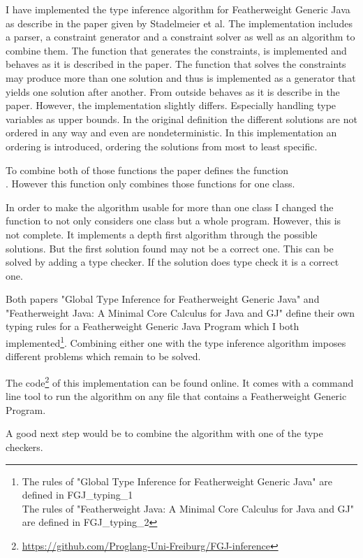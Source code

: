 I have implemented the type inference algorithm for Featherweight Generic Java as describe in the paper\cite{FGJ} given by Stadelmeier et al.
The implementation includes a parser, a constraint generator and a constraint solver as well as an algorithm to combine them.
The function  that generates the constraints, is implemented and behaves as it is described in the paper.
The function  that solves the constraints may produce more than one solution and thus is implemented as a generator that
yields one solution after another. From outside  behaves as it is describe in the paper. However, the implementation slightly
differs. Especially handling type variables as upper bounds. In the original definition the different solutions are not ordered in any way
and even are nondeterministic. In this implementation an ordering is introduced, ordering the solutions from most to least specific.

To combine both of those functions the paper defines the function\\. However this function only combines those functions
for one class.

In order to make the algorithm usable for more than one class I changed the function  to not only considers one class but a whole
program. However, this is not complete. It implements a depth first algorithm through the possible solutions. But the first solution found
may not be a correct one. This can be solved by adding a type checker. If the solution does type check it is a correct one.

Both papers "Global Type Inference for Featherweight Generic Java"\cite{FGJ} and "Featherweight Java: A Minimal Core
Calculus for Java and GJ"\cite{FJ} define their own typing rules for a Featherweight Generic Java Program which I both implemented\footnote{The rules of "Global Type Inference for Featherweight Generic Java" are defined in FGJ\_typing\_1\\The rules of "Featherweight Java: A Minimal Core Calculus for Java and GJ" are defined in FGJ\_typing\_2}.
Combining either one with the type inference algorithm imposes different problems which remain to be solved.

The code\footnote{\url{https://github.com/Proglang-Uni-Freiburg/FGJ-inference}} of this implementation can be found online. It comes with a command line tool to run the algorithm on any file that contains a
Featherweight Generic Program.

A good next step would be to combine the algorithm with one of the type checkers.
